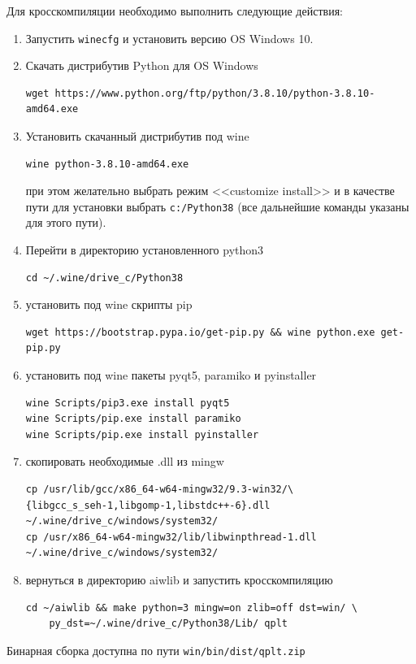 \documentclass[12pt]{article}
\begin{document}
Для кросскомпиляции необходимо выполнить следующие действия:
\begin{enumerate}
\item Запустить \verb'winecfg' и установить версию OS Windows 10.
\item Скачать дистрибутив Python для OS Windows
\begin{verbatim}
wget https://www.python.org/ftp/python/3.8.10/python-3.8.10-amd64.exe
\end{verbatim}
\item Установить скачанный дистрибутив под wine
\begin{verbatim}
wine python-3.8.10-amd64.exe
\end{verbatim}
  при этом желательно выбрать режим <<customize install>> и в качестве пути для установки выбрать \verb'c:/Python38' (все дальнейшие команды указаны для этого пути).
\item Перейти в директорию установленного python3
\begin{verbatim}
cd ~/.wine/drive_c/Python38
\end{verbatim}
\item установить под wine скрипты pip
\begin{verbatim}
wget https://bootstrap.pypa.io/get-pip.py && wine python.exe get-pip.py
\end{verbatim}
\item установить под wine пакеты pyqt5, paramiko и pyinstaller
\begin{verbatim}
wine Scripts/pip3.exe install pyqt5
wine Scripts/pip.exe install paramiko
wine Scripts/pip.exe install pyinstaller
\end{verbatim}
\item скопировать необходимые .dll из mingw
\begin{verbatim}
cp /usr/lib/gcc/x86_64-w64-mingw32/9.3-win32/\
{libgcc_s_seh-1,libgomp-1,libstdc++-6}.dll ~/.wine/drive_c/windows/system32/
cp /usr/x86_64-w64-mingw32/lib/libwinpthread-1.dll ~/.wine/drive_c/windows/system32/
\end{verbatim}
\item вернуться в директорию aiwlib  и запустить кросскомпиляцию
\begin{verbatim}
cd ~/aiwlib && make python=3 mingw=on zlib=off dst=win/ \
    py_dst=~/.wine/drive_c/Python38/Lib/ qplt
\end{verbatim}
\end{enumerate}
Бинарная сборка доступна по пути \verb'win/bin/dist/qplt.zip'
\end{document}
